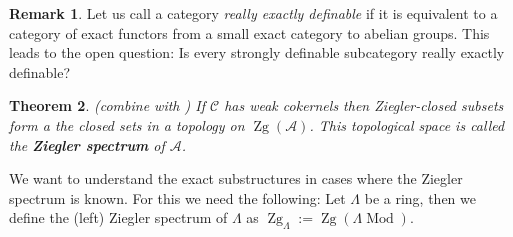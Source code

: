 \documentclass[11pt,a4paper]{amsart}
\theoremstyle{plain}
\newtheorem{thm}{Theorem}[section]
\theoremstyle{definition}
\newtheorem{rem}[thm]{Remark}
\DeclareMathOperator{\Modu}{Mod}
\newcommand{\La}{\Lambda}
\newcommand{\mcA}{\mathcal{A}}
\newcommand{\mcC}{\mathcal{C}}
\DeclareMathOperator{\Zg}{Zg}
\begin{document}
\begin{rem}
Let us call a category \emph{really exactly definable} if it is equivalent to a category of exact functors from a small exact category to abelian groups. 
This leads to the open question: Is every strongly definable subcategory really exactly definable?  
\end{rem}

\begin{thm} (combine \cite[section (3.5), Lem 1]{CB} with \cite[Lem. 12.1.12]{Kr-book})
If $\mcC$ has weak cokernels then 
Ziegler-closed subsets form a the closed sets in a  topology on $\Zg(\mcA)$. This topological space is called the \textbf{Ziegler spectrum} of $\mcA$.
\end{thm}

We want to understand the exact substructures in cases where the Ziegler spectrum is known. For this we need the following: 
Let $\La$ be a ring, then we define the (left) Ziegler spectrum of $\La $ as $\Zg_{\La}:=\Zg (\La\Modu)$.  
\end{document}
